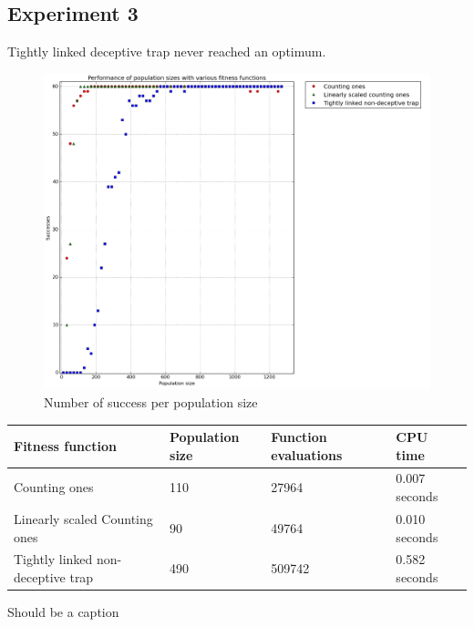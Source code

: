 \documentclass[12pt]{article}
\theoremstyle{definition}
\begin{document}
\subsection*{Experiment 3}
Tightly linked deceptive trap never reached an optimum.

\begin{figure}[H]
    \centering
    \includegraphics[totalheight=0.7\textheight]{images/exp3.png}
    \caption{Number of success per population size}
\label{fig:exp3}
\end{figure}

\begin{adjustwidth}{0cm}{}
\begin{minipage}{\linewidth}
\centering
{}
\label{tab:title}
\begin{tabular}{lp{2.5cm}p{2.5cm}l}
\toprule[1.5pt]
\bf Fitness function & \bf Population size & \bf Function evaluations & \bf CPU time\\\midrule
Counting ones & 110 & 27964 & 0.007 seconds \\
Linearly scaled Counting ones & 90 & 49764 & 0.010 seconds \\
Tightly linked non-deceptive trap & 490 & 509742 & 0.582 seconds \\
\bottomrule[1.25pt]
\end{tabular}\par
\bigskip
Should be a caption
\end{minipage}
\end{adjustwidth}
\end{document}
